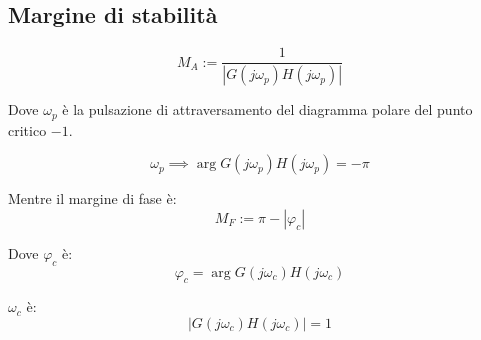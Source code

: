 \subsection{Margine di stabilità}

\begin{equation}
  M_A := \frac{1}{|G(j\omega_p)H(j\omega_p)|}
  \label{eq:margine_stabilita}
\end{equation}

Dove $\omega_p$ è la pulsazione di attraversamento del diagramma polare del
punto critico $-1$.

\begin{equation}
  \omega_p \implies \arg G(j\omega_p)H(j\omega_p) = - \pi
\end{equation}

Mentre il margine di fase è:
\begin{equation}
  M_F := \pi - |\varphi_c|
  \label{eq:margine_fase}
\end{equation}

Dove $\varphi_c$ è:
\begin{equation}
\varphi_c = \arg G(j\omega_c)H(j\omega_c)
\end{equation}

$\omega_c$ è:
\begin{equation}
  |G(j\omega_c)H(j\omega_c)| = 1
\end{equation}



